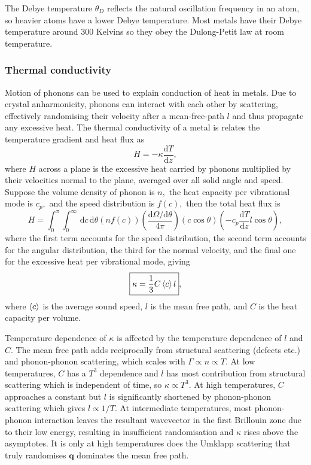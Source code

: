 \documentclass{article}
\theoremstyle{nonumberplain}
\begin{document}
The Debye temperature $\theta_D$ reflects the natural oscillation frequency in an atom, so heavier atoms have a lower Debye temperature. Most metals have their Debye temperature around $300$ Kelvins so they obey the Dulong-Petit law at room temperature. 

\subsubsection{Thermal conductivity}
Motion of phonons can be used to explain conduction of heat in metals. Due to crystal anharmonicity, phonons can interact with each other by scattering, effectively randomising their velocity after a mean-free-path $l$ and thus propagate any excessive heat. The thermal conductivity of a metal is relates the temperature gradient and heat flux as
\[
    H = -\kappa \frac{\mathrm{d}T}{\mathrm{d}z}, 
\] 
where $H$ across a plane is the excessive heat carried by phonons multiplied by their velocities normal to the plane, averaged over all solid angle and speed. Suppose the volume density of phonon is $n,$ the heat capacity per vibrational mode is $c_p,$ and the speed distribution is $f(c),$ then the total heat flux is 
\[
    H = \int_{0}^{\pi } \int_{0}^{\infty } \,\mathrm{d}c \,\mathrm{d}\theta  
    (n f(c) ) \left( \frac{\mathrm{d} \Omega  / \mathrm{d} \theta }{4\pi } \right) (c \cos \theta) \left(- c_p \frac{\mathrm{d}T}{\mathrm{d}z} l \cos \theta \right), 
\]
where the first term accounts for the speed distribution, the second term accounts for the angular distribution, the third for the normal velocity, and the final one for the excessive heat per vibrational mode, giving
\[
    \boxed{\kappa = \frac{1}{3}C \expval{c} l }, 
\]
where $\expval{c}$ is the average sound speed, $l$ is the mean free path, and $C$ is the heat capacity per volume. 

Temperature dependence of $\kappa $ is affected by the temperature dependence of $l$ and $C.$ The mean free path adds reciprocally from structural scattering (defects etc.) and phonon-phonon scattering, which scales with $\Gamma \propto n \propto T.$ At low temperatures, $C$ has a $T^3$ dependence and $l$ has most contribution from structural scattering which is independent of time, so $\kappa \propto T^3.$ At high temperatures, $C$ approaches a constant but $l$ is significantly shortened by phonon-phonon scattering which gives $l\propto 1/T.$ At intermediate temperatures, most phonon-phonon interaction leaves the resultant wavevector in the first Brillouin zone due to their low energy, resulting in insufficient randomisation and $\kappa $ rises above the asymptotes. It is only at high temperatures does the Umklapp scattering that truly randomises $\mathbf{q}$ dominates the mean free path. 
\end{document}
